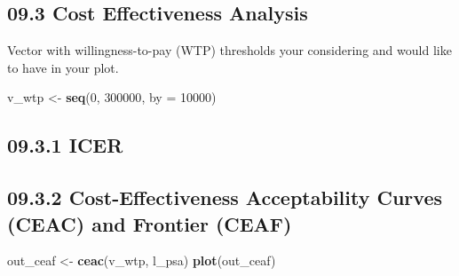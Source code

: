 \documentclass[
]{article}
\newenvironment{Shaded}{\begin{snugshade}}{\end{snugshade}}
\newcommand{\CommentTok}[1]{\textcolor[rgb]{0.56,0.35,0.01}{\textit{#1}}}
\newcommand{\DataTypeTok}[1]{\textcolor[rgb]{0.13,0.29,0.53}{#1}}
\newcommand{\DecValTok}[1]{\textcolor[rgb]{0.00,0.00,0.81}{#1}}
\newcommand{\KeywordTok}[1]{\textcolor[rgb]{0.13,0.29,0.53}{\textbf{#1}}}
\newcommand{\NormalTok}[1]{#1}
\newcommand{\OperatorTok}[1]{\textcolor[rgb]{0.81,0.36,0.00}{\textbf{#1}}}
\newcommand{\StringTok}[1]{\textcolor[rgb]{0.31,0.60,0.02}{#1}}
\begin{document}
\hypertarget{cost-effectiveness-analysis-1}{%
\subsection{09.3 Cost Effectiveness
Analysis}\label{cost-effectiveness-analysis-1}}

Vector with willingness-to-pay (WTP) thresholds your considering and
would like to have in your plot.

\begin{Shaded}
\begin{Highlighting}[]
\NormalTok{v_wtp <-}\StringTok{ }\KeywordTok{seq}\NormalTok{(}\DecValTok{0}\NormalTok{, }\DecValTok{300000}\NormalTok{, }\DataTypeTok{by =} \DecValTok{10000}\NormalTok{)}
\end{Highlighting}
\end{Shaded}

\hypertarget{icer}{%
\subsection{09.3.1 ICER}\label{icer}}

\begin{Shaded}
\end{Shaded}

\hypertarget{cost-effectiveness-acceptability-curves-ceac-and-frontier-ceaf}{%
\subsection{09.3.2 Cost-Effectiveness Acceptability Curves (CEAC) and
Frontier
(CEAF)}\label{cost-effectiveness-acceptability-curves-ceac-and-frontier-ceaf}}

\begin{Shaded}
\begin{Highlighting}[]
\NormalTok{out_ceaf <-}\StringTok{ }\KeywordTok{ceac}\NormalTok{(v_wtp, l_psa)}
\KeywordTok{plot}\NormalTok{(out_ceaf)}
\end{Highlighting}
\end{Shaded}
\end{document}
